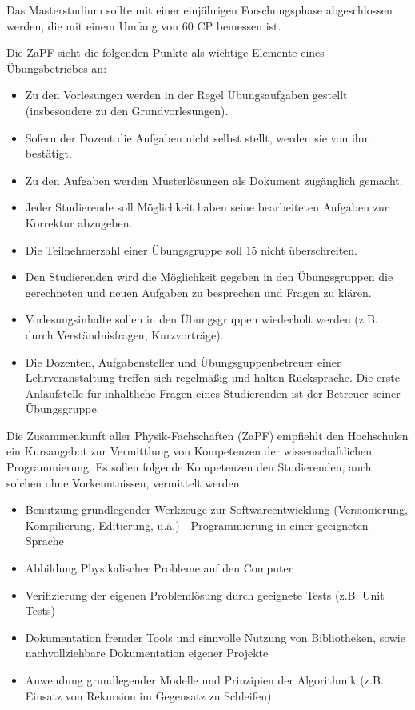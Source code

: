 \documentclass[a4paper]{scrartcl}
\begin{document}
\textcolor{Bernd}{\textbf{\cite{RESO: SoSe2010-BaMa}} Das Masterstudium sollte mit einer einjährigen Forschungsphase abgeschlossen werden, die mit einem Umfang von 60 CP bemessen ist.}\\

\textcolor{Bernd}{\textbf{\cite{RESO: WiSe2010-UebKon}}Die ZaPF sieht die folgenden Punkte als wichtige Elemente eines Übungsbetriebes an:
\begin{itemize}
\item Zu den Vorlesungen werden in der Regel Übungsaufgaben gestellt (insbesondere zu den Grundvorlesungen).
\item Sofern der Dozent die Aufgaben nicht selbst stellt, werden sie von ihm bestätigt.
\item Zu den Aufgaben werden Musterlösungen als Dokument zugänglich gemacht.
\item Jeder Studierende soll Möglichkeit haben seine bearbeiteten Aufgaben zur Korrektur abzugeben.
\item Die Teilnehmerzahl einer Übungsgruppe soll 15 nicht überschreiten.
\item Den Studierenden wird die Möglichkeit gegeben in den Übungsgruppen die gerechneten und neuen Aufgaben zu besprechen und Fragen zu klären.
\item Vorlesungsinhalte sollen in den Übungsgruppen wiederholt werden (z.B. durch Verständnisfragen, Kurzvorträge).
\item Die Dozenten, Aufgabensteller und Übungsguppenbetreuer einer Lehrveranstaltung treffen sich regelmäßig und halten Rücksprache. Die erste Anlaufstelle für inhaltliche Fragen eines Studierenden ist der Betreuer seiner Übungsgruppe.
\end{itemize}}

\textcolor{Bernd}{\textbf{\cite{POS: SoSe2016-Prog}} Die Zusammenkunft aller Physik-Fachschaften (ZaPF) empfiehlt den Hochschulen ein Kursangebot zur Vermittlung von Kompetenzen der wissenschaftlichen Programmierung. Es sollen folgende Kompetenzen den Studierenden, auch solchen ohne Vorkenntnissen, vermittelt werden:
\begin{itemize}
\item Benutzung grundlegender Werkzeuge zur Softwareentwicklung (Versionierung, Kompilierung, Editierung, u.ä.) - Programmierung in einer geeigneten Sprache
\item Abbildung Physikalischer Probleme auf den Computer
\item Verifizierung der eigenen Problemlösung durch geeignete Tests (z.B. Unit Tests)
\item Dokumentation fremder Tools und sinnvolle Nutzung von Bibliotheken, sowie nachvollziehbare Dokumentation eigener Projekte
\item Anwendung grundlegender Modelle und Prinzipien der Algorithmik (z.B. Einsatz von Rekursion im Gegensatz zu Schleifen)
\end{itemize}
}
\end{document}
